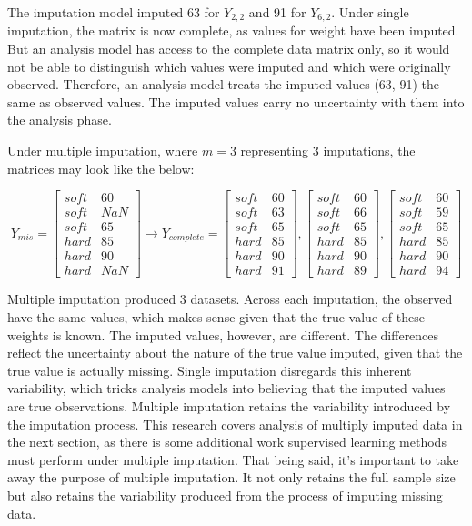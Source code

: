 \documentclass[12pt,oneside]{chicagocapstone}
\begin{document}
The imputation model imputed 63 for \(Y_{2,2}\) and 91 for \(Y_{6,2}\).
Under single imputation, the matrix is now complete, as values for
weight have been imputed. But an analysis model has access to the
complete data matrix only, so it would not be able to distinguish which
values were imputed and which were originally observed. Therefore, an
analysis model treats the imputed values (63, 91) the same as observed
values. The imputed values carry no uncertainty with them into the
analysis phase.

Under multiple imputation, where \(m=3\) representing 3 imputations, the
matrices may look like the below:

\[Y_{mis}=\begin{bmatrix}soft & 60 \\ soft & NaN \\ soft & 65 \\ hard & 85 \\ hard & 90 \\ hard & NaN \end{bmatrix} \rightarrow Y_{complete}=\begin{bmatrix}soft & 60 \\ soft & 63 \\ soft & 65 \\ hard & 85 \\ hard & 90 \\ hard & 91 \end{bmatrix}, \begin{bmatrix}soft & 60 \\ soft & 66 \\ soft & 65 \\ hard & 85 \\ hard & 90 \\ hard & 89 \end{bmatrix},
\begin{bmatrix}soft & 60 \\ soft & 59 \\ soft & 65 \\ hard & 85 \\ hard & 90 \\ hard & 94 \end{bmatrix}\]

Multiple imputation produced 3 datasets. Across each imputation, the
observed have the same values, which makes sense given that the true
value of these weights is known. The imputed values, however, are
different. The differences reflect the uncertainty about the nature of
the true value imputed, given that the true value is actually missing.
Single imputation disregards this inherent variability, which tricks
analysis models into believing that the imputed values are true
observations. Multiple imputation retains the variability introduced by
the imputation process. This research covers analysis of multiply
imputed data in the next section, as there is some additional work
supervised learning methods must perform under multiple imputation. That
being said, it's important to take away the purpose of multiple
imputation. It not only retains the full sample size but also retains
the variability produced from the process of imputing missing data.
\end{document}

